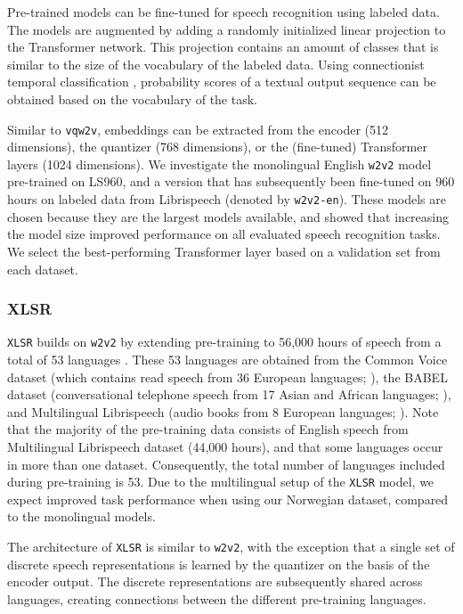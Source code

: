 \documentclass[11pt,a4paper]{article}
\begin{document}
Pre-trained models can be fine-tuned for speech recognition using labeled data.
The models are augmented by adding a randomly initialized linear projection to the Transformer network.
This projection contains an amount of classes that is similar to the size of the vocabulary of the labeled data.
Using connectionist temporal classification \citep{graves2006connectionist}, probability scores of a textual output sequence can be obtained based on the vocabulary of the task.

Similar to \texttt{vqw2v}, embeddings can be extracted from the encoder (512 dimensions), the quantizer (768 dimensions), or the (fine-tuned) Transformer layers (1024 dimensions).
We investigate the monolingual English \texttt{w2v2} model pre-trained on LS960, and a version that has subsequently been fine-tuned on 960 hours on labeled data from Librispeech (denoted by \texttt{w2v2-en}).
These models are chosen because they are the largest models available, and \citet{baevski2020wav2vec} showed that increasing the model size improved performance on all evaluated speech recognition tasks.
We select the best-performing Transformer layer based on a validation set from each dataset.

\subsubsection{XLSR}
\texttt{XLSR} builds on \texttt{w2v2} by extending pre-training to 56,000 hours of speech from a total of 53 languages \citep{conneau2020unsupervised}.
These 53 languages are obtained from the Common Voice dataset (which contains read speech from 36 European languages; \citealp{ardila2019common}), the BABEL dataset (conversational telephone speech from 17 Asian and African languages; \citealp{gales2014speech}), and Multilingual Librispeech (audio books from 8 European languages; \citealp{pratap2020mls}).
Note that the majority of the pre-training data consists of English speech from Multilingual Librispeech dataset (44,000 hours), and that some languages occur in more than one dataset. Consequently, the total number of languages included during pre-training is 53.
Due to the multilingual setup of the \texttt{XLSR} model, we expect improved task performance when using our Norwegian dataset, compared to the monolingual models.

The architecture of \texttt{XLSR} is similar to \texttt{w2v2}, with the exception that a single set of discrete speech representations is learned by the quantizer on the basis of the encoder output.
The discrete representations are subsequently shared across languages, creating connections between the different pre-training languages. 
\end{document}
